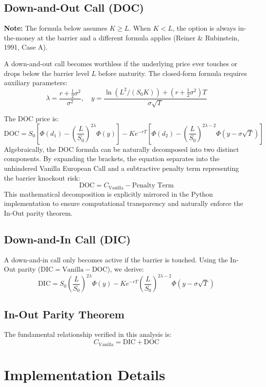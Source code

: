 \documentclass{report}
\begin{document}
\subsection{Down-and-Out Call (DOC)}
\textbf{Note:} The formula below assumes $K \geq L$. When $K < L$, the option is always in-the-money at the barrier and a different formula applies (Reiner \& Rubinstein, 1991, Case A).

A down-and-out call becomes worthless if the underlying price ever touches or drops below the barrier level $L$ before maturity. The closed-form formula requires auxiliary parameters:
$$\lambda = \frac{r + \frac{1}{2}\sigma^2}{\sigma^2}, \quad y = \frac{\ln(L^2/(S_0 K)) + (r + \frac{1}{2}\sigma^2)T}{\sigma\sqrt{T}}$$

The DOC price is:
$$\text{DOC} = S_0 \left[\Phi(d_1) - \left(\frac{L}{S_0}\right)^{2\lambda} \Phi(y)\right] - K e^{-rT} \left[\Phi(d_2) - \left(\frac{L}{S_0}\right)^{2\lambda - 2} \Phi(y - \sigma\sqrt{T})\right]$$
Algebraically, the DOC formula can be naturally decomposed into two distinct components. By expanding the brackets, the equation separates into the unhindered Vanilla European Call and a subtractive penalty term representing the barrier knockout risk:
$$ \text{DOC} = C_{\text{Vanilla}} - \text{Penalty Term} $$
This mathematical decomposition is explicitly mirrored in the Python implementation to ensure computational transparency and naturally enforce the In-Out parity theorem.

\subsection{Down-and-In Call (DIC)}
A down-and-in call only becomes active if the barrier is touched. Using the In-Out parity ($\text{DIC} = \text{Vanilla} - \text{DOC}$), we derive:
$$\text{DIC} = S_0 \left(\frac{L}{S_0}\right)^{2\lambda} \Phi(y) - K e^{-rT} \left(\frac{L}{S_0}\right)^{2\lambda - 2} \Phi(y - \sigma\sqrt{T})$$

\subsection{In-Out Parity Theorem}
The fundamental relationship verified in this analysis is:
$$C_{\text{Vanilla}} = \text{DIC} + \text{DOC}$$

\section{Implementation Details}
\end{document}
